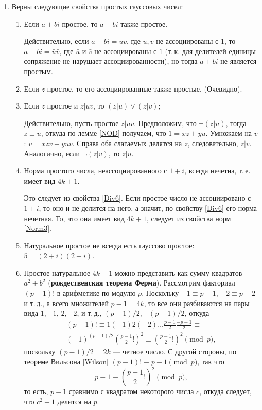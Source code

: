 \begin{enumerate}
\item Верны следующие свойства простых гауссовых чисел:
\begin{enumerate}
\item Если $a+bi$ простое, то $a-bi$ также простое.

Действительно, если $a-bi=uv$, где $u,v$ не ассоциированы с $1$, то $a+bi=\bar u\bar v$, где $\bar u$ и $\bar v$ не ассоциированы с $1$ (т.\,к. для делителей единицы сопряжение не нарушает ассоциированности), но тогда $a+bi$ не является простым.
\item Если $z$ простое, то его ассоциированные также простые. (Очевидно).
\item \label{Prim3}Если $z$ простое и $z|uv$, то $(z|u)\vee(z|v)$;

Действительно, пусть простое $z|uv$. Предположим, что $\neg(z|u)$, тогда $z\perp u$, откуда по лемме \ref{NOD} получаем, что $1=xz+yu$. Умножаем на $v$: $v=xzv+yuv$. Справа оба слагаемых делятся на $z$, следовательно, $z|v$. Аналогично, если $\neg(z|v)$, то $z|u$.

\item Норма простого числа, неассоциированного с $1+i$, всегда нечетна, т.\,е. имеет вид $4k+1$.

Это следует из свойства \ref{Div6}. Если простое число не ассоциировано с $1+i$, то оно и не делится на него, а значит, по свойству \ref{Div6} его норма нечетная. То, что она имеет вид $4k+1$, следует из свойства норм \ref{Norm3}.
\item Натуральное простое не всегда есть гауссово простое: $5=(2+i)(2-i)$.
\item Простое натуральное $4k+1$ можно представить как сумму квадратов $a^2+b^2$ (\textbf{рождественская теорема Ферма}).
\pf Рассмотрим факториал $(p-1)!$ в арифметике по модулю $p$. Поскольку $-1\equiv p-1$, $-2\equiv p-2$ и т.\,д., а всего множителей $p-1=4k$, то все они разбиваются на пары вида $1,-1$, $2,-2$, и т.\,д., $(p-1)/2,-(p-1)/2$, откуда
\begin{multline*}
(p-1)! \equiv 1(-1)2(-2)\dots\frac{p-1}{2}\frac{-p+1}{2} \equiv \\
 (-1)^{(p-1)/2}\left(\frac{p-1}{2}!\right)^2 \equiv \left(\frac{p-1}{2}!\right)^2\pmod p,
\end{multline*}
поскольку $(p-1)/2=2k$ --- четное число. С другой стороны, по теореме Вильсона \ref{Wilson} $(p-1)!\equiv p-1\pmod p$, так что
$$
p-1\equiv \left(\frac{p-1}{2}!\right)^2\pmod p,
$$
то есть, $p-1$ сравнимо с квадратом некоторого числа $c$, откуда следует, что $c^2+1$ делится на $p$.


\end{enumerate}
\end{enumerate}

